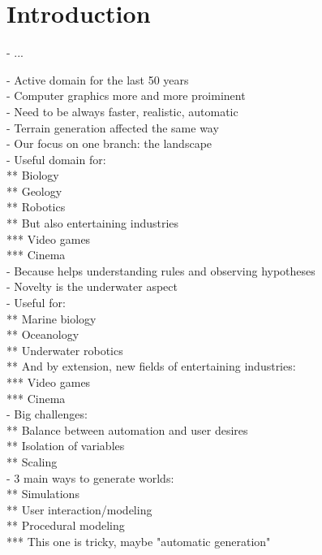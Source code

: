 \chapter{Introduction}
\label{chap:introduction}
- ...

- Active domain for the last 50 years \\
- Computer graphics more and more proiminent \\
- Need to be always faster, realistic, automatic \\
- Terrain generation affected the same way \\
- Our focus on one branch: the landscape \\
- Useful domain for: \\
** Biology \\
** Geology \\
** Robotics \\
** But also entertaining industries \\
*** Video games \\
*** Cinema \\
- Because helps understanding rules and observing hypotheses \\
- Novelty is the underwater aspect \\
- Useful for: \\
** Marine biology \\
** Oceanology \\
** Underwater robotics \\
** And by extension, new fields of entertaining industries: \\
*** Video games \\
*** Cinema \\
- Big challenges: \\
** Balance between automation and user desires \\
** Isolation of variables \\
** Scaling \\
- 3 main ways to generate worlds: \\
** Simulations \\
** User interaction/modeling \\
** Procedural modeling \\
*** This one is tricky, maybe "automatic generation" \\

